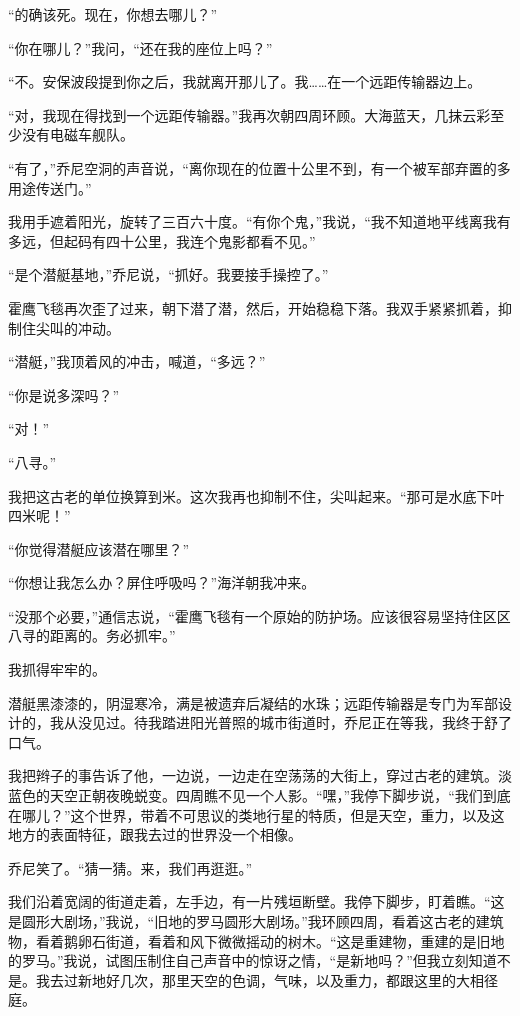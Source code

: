 \documentclass[AutoFakeBold=true]{book}
\begin{document}
``的确该死。现在，你想去哪儿？''

``你在哪儿？''我问，``还在我的座位上吗？''

``不。安保波段提到你之后，我就离开那儿了。我……在一个远距传输器边上。

``对，我现在得找到一个远距传输器。''我再次朝四周环顾。大海蓝天，几抹云彩至少没有电磁车舰队。

``有了，''乔尼空洞的声音说，``离你现在的位置十公里不到，有一个被军部弃置的多用途传送门。''

我用手遮着阳光，旋转了三百六十度。``有你个鬼，''我说，``我不知道地平线离我有多远，但起码有四十公里，我连个鬼影都看不见。''

``是个潜艇基地，''乔尼说，``抓好。我要接手操控了。''

霍鹰飞毯再次歪了过来，朝下潜了潜，然后，开始稳稳下落。我双手紧紧抓着，抑制住尖叫的冲动。

``潜艇，''我顶着风的冲击，喊道，``多远？''

``你是说多深吗？''

``对！''

``八寻。''

我把这古老的单位换算到米。这次我再也抑制不住，尖叫起来。``那可是水底下叶四米呢！''

``你觉得潜艇应该潜在哪里？''

``你想让我怎么办？屏住呼吸吗？''海洋朝我冲来。

``没那个必要，''通信志说，``霍鹰飞毯有一个原始的防护场。应该很容易坚持住区区八寻的距离的。务必抓牢。''

我抓得牢牢的。

\vspace*{1em}

潜艇黑漆漆的，阴湿寒冷，满是被遗弃后凝结的水珠；远距传输器是专门为军部设计的，我从没见过。待我踏进阳光普照的城市街道时，乔尼正在等我，我终于舒了口气。

我把辫子的事告诉了他，一边说，一边走在空荡荡的大街上，穿过古老的建筑。淡蓝色的天空正朝夜晚蜕变。四周瞧不见一个人影。``嘿，''我停下脚步说，``我们到底在哪儿？''这个世界，带着不可思议的类地行星的特质，但是天空，重力，以及这地方的表面特征，跟我去过的世界没一个相像。

乔尼笑了。``猜一猜。来，我们再逛逛。''

我们沿着宽阔的街道走着，左手边，有一片残垣断壁。我停下脚步，盯着瞧。``这是圆形大剧场，''我说，``旧地的罗马圆形大剧场。''我环顾四周，看着这古老的建筑物，看着鹅卵石街道，看着和风下微微摇动的树木。``这是重建物，重建的是旧地的罗马。''我说，试图压制住自己声音中的惊讶之情，``是新地吗？''但我立刻知道不是。我去过新地好几次，那里天空的色调，气味，以及重力，都跟这里的大相径庭。
\end{document}
